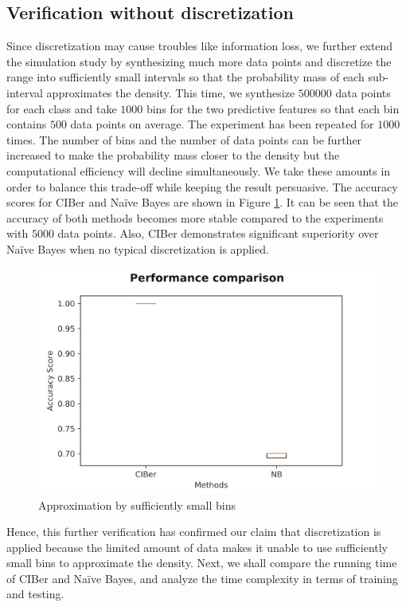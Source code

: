 \documentclass[twoside,11pt]{article}
\begin{document}
\subsection{Verification without discretization}\label{simulation_without_discrete}
Since discretization may cause troubles like information loss, we further extend the simulation study by synthesizing much more data points and discretize the range into sufficiently small intervals so that the probability mass of each sub-interval approximates the density. This time, we synthesize $500000$ data points for each class and take $1000$ bins for the two predictive features so that each bin contains $500$ data points on average. The experiment has been repeated for $1000$ times. The number of bins and the number of data points can be further increased to make the probability mass closer to the density but the computational efficiency will decline simultaneously. We take these amounts in order to balance this trade-off while keeping the result persuasive. The accuracy scores for CIBer and Na\"ive Bayes are shown in Figure \ref{without_discrete}. It can be seen that the accuracy of both methods becomes more stable compared to the experiments with $5000$ data points. Also, CIBer demonstrates significant superiority over Na\"ive Bayes when no typical discretization is applied.

\begin{figure}
    \centering
    \includegraphics[scale=0.7]{Figures/simulation/sufficiently small discrete.png}
    \caption{Approximation by sufficiently small bins}
    \label{without_discrete}
\end{figure}

Hence, this further verification has confirmed our claim that discretization is applied because the limited amount of data makes it unable to use sufficiently small bins to approximate the density. Next, we shall compare the running time of CIBer and Na\"ive Bayes, and analyze the time complexity in terms of training and testing. 
\end{document}
